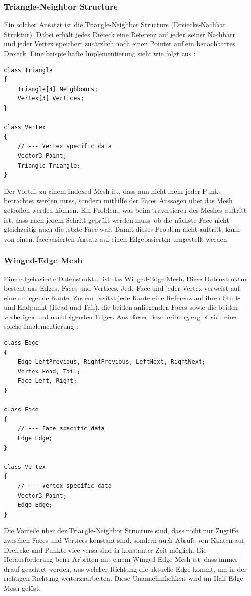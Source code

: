 \subsubsection{Triangle-Neighbor Structure}
Ein solcher Ansatzt ist die Triangle-Neighbor Structure (Dreiecks-Nachbar Struktur). Dabei erh\"alt jedes Dreieck eine Referenz auf jeden seiner Nachbarn und jeder Vertex speichert zus\"atzlich noch einen Pointer auf ein benachbartes Dreieck. Eine beispielhafte Implementierung sieht wie folgt aus \cite[S.269]{Shirley2010}:
\begin{lstlisting}
class Triangle 
{
	Triangle[3] Neighbours;
	Vertex[3] Vertices; 
}

class Vertex 
{
	// --- Vertex specific data
	Vector3 Point;
	Triangle Triangle;
}
\end{lstlisting}

Der Vorteil zu einem Indexed Mesh ist, dass nun nicht mehr jeder Punkt betrachtet werden muss, sondern mithilfe der Faces Aussagen \"uber das Mesh getroffen werden k\"onnen. Ein Problem, was beim traversieren des Meshes auftritt ist, dass nach jedem Schritt gepr\"uft werden muss, ob die n\"achste Face nicht gleichzeitig auch die letzte Face war. Damit dieses Problem nicht auftritt, kann von einem facebasierten Ansatz auf einen Edgebasierten umgestellt werden.

\subsubsection{Winged-Edge Mesh}
Eine edgebasierte Datenstruktur ist das Winged-Edge Mesh. Diese Datenstruktur besteht aus Edges, Faces und Vertices. Jede Face und jeder Vertex verweist auf eine anliegende Kante. Zudem besitzt jede Kante eine Referenz auf ihren Start- und Endpunkt (Head und Tail), die beiden anliegenden Faces sowie die beiden vorherigen und nachfolgenden Edges. Aus dieser Beschreibung ergibt sich eine solche Implementierung \cite[S.273]{Shirley2010}:

\begin{lstlisting}
class Edge
{
	Edge LeftPrevious, RightPrevious, LeftNext, RightNext;
	Vertex Head, Tail;
	Face Left, Right;
}

class Face 
{
	// --- Face specific data
	Edge Edge;
}

class Vertex 
{
	// --- Vertex specific data
	Vector3 Point;
	Edge Edge;
}
\end{lstlisting}

Die Vorteile \"uber der Triangle-Neighbor Structure sind, dass nicht nur Zugriffe zwischen Faces und Vertices konstant sind, sondern auch Abrufe von Kanten auf Dreiecke und Punkte vice versa sind in konstanter Zeit m\"oglich. Die Herausforderung beim Arbeiten mit einem Winged-Edge Mesh ist, dass immer drauf geachtet werden, aus welcher Richtung die aktuelle Edge kommt, um in der richtigen Richtung weiterzuarbeiten. Diese Unannehmlichkeit wird im Half-Edge Mesh gel\"ost.